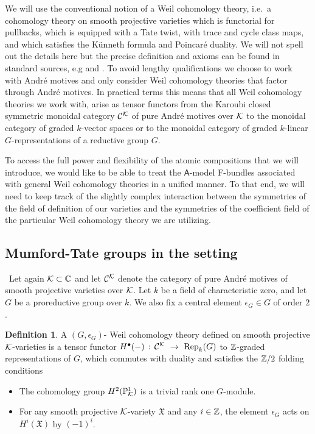 \documentclass[twoside,leqno]{article}
\numberwithin{equation}{section}
\theoremstyle{plain}
\theoremstyle{definition}
\newtheorem{definition}[equation]{Definition}
\begin{document}
We will use the conventional notion of a Weil cohomology theory, i.e.\ a cohomology theory on smooth projective varieties which is functorial for pullbacks, which is equipped with a Tate twist, with trace and cycle class maps, and which satisfies the K\"{u}nneth formula and Poincar\'{e} duality. We will not spell out the details here but the precise definition and axioms can be found in standard sources, e.g \cite[Definition~1.2.13]{murre} and \cite[Chapter~45,tag~0FFG]{stacksproject}.  To avoid lengthy qualifications we choose to work with Andr\'{e} motives and only consider Weil cohomology theories that factor through Andr\'{e} motives. In practical terms this means that all Weil cohomology theories we work with, arise as tensor functors from the Karoubi closed symmetric monoidal category $\mathcal{C}^{\mathcal K}$ of pure Andr\'{e} motives over $\mathcal K$ to the monoidal category of graded $k$-vector spaces or to the monoidal category of graded $k$-linear $G$-representations of a reductive group $G$.

To access the full power and flexibility of the atomic compositions that we will introduce, we would like  to be able to treat the $\mathsf{A}$-model F-bundles associated with general Weil cohomology theories in a unified manner. To that end, we will need to keep track of the slightly complex
interaction between the symmetries of the field of definition  of our varieties and the symmetries of the coefficient field of the particular Weil cohomology theory we are  utilizing.

\subsection{Mumford-Tate groups in the \texorpdfstring{\nc}{nc} setting} \label{ssec:MTnc} \ 
Let again $\mathcal K \subset \mathbb C$ and let $\mathcal{C}^{\mathcal K}$ denote the category of pure Andr\'{e} motives of smooth projective varieties over $\mathcal K$. Let $k$ be a field of characteristic zero, and 
let $G$ be a proreductive group over $k$. We  also fix a central element $\epsilon_{G} \in G$ of order $2$.

\begin{definition}  \label{def:MTsymmetry} 
A  $(G,\epsilon_{G})$-  Weil cohomology theory defined on smooth projective $\mathcal K$-varieties is a tensor functor $H^{\bullet}(-) \, : \, \CA{\kay} \ \to \ \Rep_{k}(G)$
to $\mathbb Z$-graded representations of $G$, which commutes with duality and satisfies the $\mathbb Z/2$ folding 
conditions
\begin{itemize}
    \item The cohomology group $H^2(\mathbb P^1_{\mathcal K})$ is a trivial rank one  $G$-module.
    \item For any smooth projective $\mathcal K$-variety $\mathfrak{X}$ and any $i \in \mathbb Z$, the element $\epsilon_{G}$ acts on $H^i(\mathfrak{X})$ by $(-1)^i$.
\end{itemize}
\end{definition}
\end{document}
